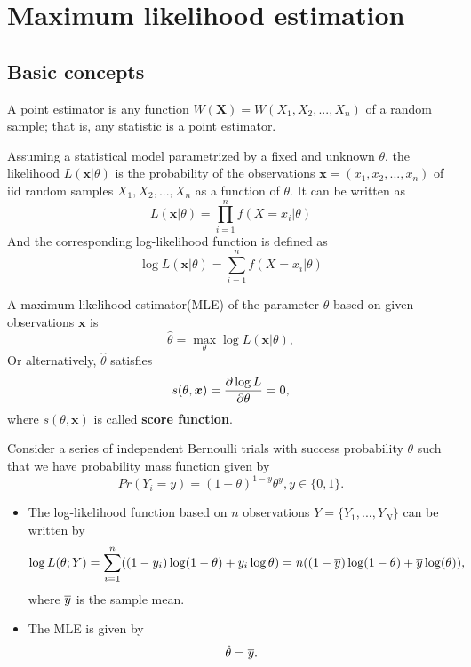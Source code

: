 \begin{refsection}
\begin{remark}
\begin{itemize}
\end{itemize}	
	
\end{remark}


\section{Maximum likelihood estimation}
\subsection{Basic concepts}
\begin{definition}[estimator]\cite[315]{casella2002statistical}
	A point estimator is any function $W(\bm{X})=W(X_1,X_2,...,X_n)$ of a random sample; that is, any statistic is a point estimator.
\end{definition}

\begin{definition}
	\cite[22]{pawitan2001all}
	Assuming a statistical model parametrized by a fixed and unknown $\theta$, the likelihood $L(\bm{x}|\theta)$ is the probability of the observations $\bm{x}=(x_1,x_2,...,x_n)$ of iid random samples $X_1,X_2,...,X_n$ as a function of $\theta$. It can be written as
	$$L(\bm{x}|\theta) = \prod_{i=1}^n f(X=x_i|\theta)$$
	And the corresponding log-likelihood function is defined as
	$$\log L(\bm{x}|\theta) = \sum_{i=1}^n f(X=x_i|\theta)$$
	
\end{definition}

\begin{definition}
	\cite[316]{casella2002statistical} A maximum likelihood estimator(MLE) of the parameter $\theta$ based on given observations $\bm{x}$ is 
	$$\hat{\theta} = \max_{\theta} \log L(\bm{x}|\theta),$$
Or alternatively,
$\hat{\theta}$ satisfies
 	$$s(\theta,\bm{x}) = \frac{\partial \log L}{\partial \theta} = 0,$$
 where $s(\theta,\bm{x})$ is called \textbf{score function}.
\end{definition}




\begin{example}
Consider a series of independent Bernoulli trials with success probability $\theta$ such that we have probability mass function given by	
$$Pr(Y_i = y) = (1-\theta)^{1-y} \theta^y, y\in \{0,1 \}.$$

\begin{itemize}
	\item 
	The log-likelihood function based on $n$ observations $Y=\{Y_1,...,Y_N\}$ can be written by
	$$\log L(\theta; Y) = \sum_{i=1}^n ((1-y_i) \log(1-\theta) + y_i \log \theta) = n((1-\overline{y})\log(1-\theta) + \overline{y}\log(\theta)),$$
	where $\overline{y}$ is the sample mean.
	\item 
	The MLE is given by
	$$\hat{\theta} = \overline{y}.$$
\end{itemize}
\end{example}


\end{refsection}
